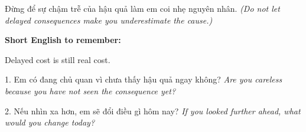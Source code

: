 \begin{baihoc}
Đừng để sự chậm trễ của hậu quả làm em coi nhẹ nguyên nhân.
\textit{(Do not let delayed consequences make you underestimate the cause.)}
\end{baihoc}

\begin{ghinhoanh}
\textbf{Short English to remember:}

Delayed cost is still real cost.

\end{ghinhoanh}

\begin{tuhocnhanh}
1. Em có đang chủ quan vì chưa thấy hậu quả ngay không? \textit{Are you careless because you have not seen the consequence yet?}

2. Nếu nhìn xa hơn, em sẽ đổi điều gì hôm nay? \textit{If you looked further ahead, what would you change today?}
\end{tuhocnhanh}
\ngancach